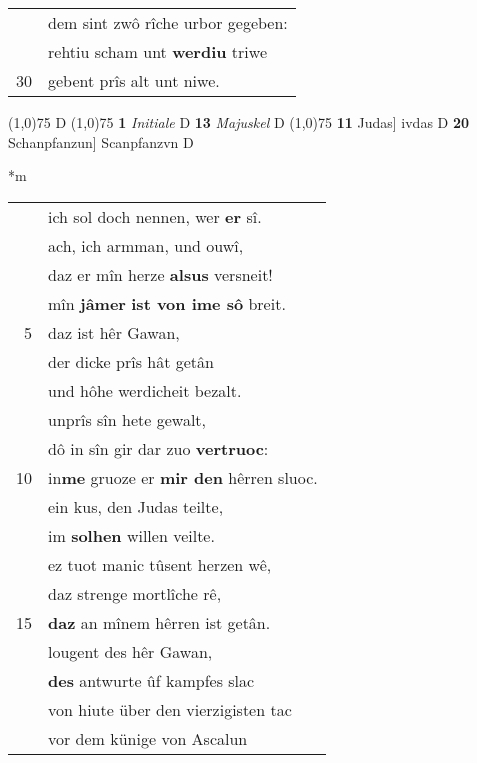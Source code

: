 \documentclass[8pt,a4paper,notitlepage]{article}
\begin{document}
\begin{table}[ht]
\begin{minipage}[t]{0.5\linewidth}
\begin{tabular}{rl}
 & dem sint zwô rîche urbor gegeben:\\ 
 & rehtiu scham unt \textbf{werdiu} triwe\\ 
30 & gebent prîs alt unt niwe.\\ 
\end{tabular}
\scriptsize
\line(1,0){75} \newline
D \newline
\line(1,0){75} \newline
\textbf{1} \textit{Initiale} D  \textbf{13} \textit{Majuskel} D  \newline
\line(1,0){75} \newline
\textbf{11} Judas] ivdas D \textbf{20} Schanpfanzun] Scanpfanzvn D \newline
\end{minipage}
\hspace{0.5cm}
\begin{minipage}[t]{0.5\linewidth}
\small
\begin{center}*m
\end{center}
\begin{tabular}{rl}
 & ich sol doch nennen, wer \textbf{er} sî.\\ 
 & ach, ich armman, und ouwî,\\ 
 & daz er mîn herze \textbf{alsus} versneit!\\ 
 & mîn \textbf{jâmer} \textbf{ist von ime sô} breit.\\ 
5 & daz ist hêr Gawan,\\ 
 & der dicke prîs hât getân\\ 
 & und hôhe werdicheit bezalt.\\ 
 & unprîs sîn hete gewalt,\\ 
 & dô in sîn gir dar zuo \textbf{vertruoc}:\\ 
10 & in\textbf{me} gruoze er \textbf{mir den} hêrren sluoc.\\ 
 & ein kus, den Judas teilte,\\ 
 & im \textbf{solhen} willen veilte.\\ 
 & ez tuot manic tûsent herzen wê,\\ 
 & daz strenge mortlîche rê,\\ 
15 & \textbf{daz} an mînem hêrren ist getân.\\ 
 & lougent des hêr Gawan,\\ 
 & \textbf{des} antwurte ûf kampfes slac\\ 
 & von hiute über den vierzigisten tac\\ 
 & vor dem künige von Ascalun\\ 

\end{tabular}
\end{minipage}
\end{table}
\end{document}
